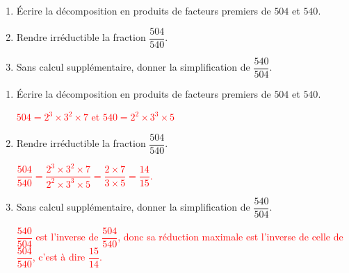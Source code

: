 \begin{exercice*}    
    \begin{enumerate}
        \item Écrire la décomposition en produits de facteurs premiers de $504$ et $540$.
        \item Rendre irréductible la fraction $\dfrac{504}{540}$.
        \item Sans calcul supplémentaire, donner la simplification de $\dfrac{540}{504}$.        
    \end{enumerate}
    
\end{exercice*}
\begin{corrige}
    \begin{enumerate}
        \item Écrire la décomposition en produits de facteurs premiers de $504$ et $540$.
        
        \textcolor{red}{
            $504 = 2^3\times 3^2\times 7$ et $540 = 2^2\times 3^3\times 5$
        }
        \item Rendre irréductible la fraction $\dfrac{504}{540}$.
        
        \textcolor{red}{
            $\dfrac{504}{540} = \dfrac{2^3\times 3^2\times 7}{2^2\times 3^3\times 5} = \dfrac{2\times 7}{3\times 5} = \dfrac{14}{15}$.
        }
        \item Sans calcul supplémentaire, donner la simplification de $\dfrac{540}{504}$.        
        
        \textcolor{red}{
            $\dfrac{540}{504}$ est l'inverse de $\dfrac{504}{540}$, donc sa réduction maximale est l'inverse de celle de $\dfrac{504}{540}$, c'est à dire $\dfrac{15}{14}$.
        }
    \end{enumerate}

\end{corrige}

